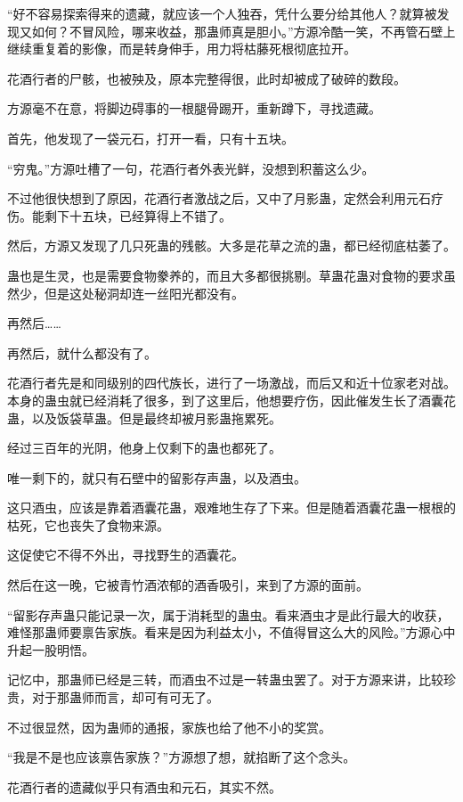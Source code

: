 \begin{this_body}
“好不容易探索得来的遗藏，就应该一个人独吞，凭什么要分给其他人？就算被发现又如何？不冒风险，哪来收益，那蛊师真是胆小。”方源冷酷一笑，不再管石壁上继续重复着的影像，而是转身伸手，用力将枯藤死根彻底拉开。

花酒行者的尸骸，也被殃及，原本完整得很，此时却被成了破碎的数段。

方源毫不在意，将脚边碍事的一根腿骨踢开，重新蹲下，寻找遗藏。

首先，他发现了一袋元石，打开一看，只有十五块。

“穷鬼。”方源吐槽了一句，花酒行者外表光鲜，没想到积蓄这么少。

不过他很快想到了原因，花酒行者激战之后，又中了月影蛊，定然会利用元石疗伤。能剩下十五块，已经算得上不错了。

然后，方源又发现了几只死蛊的残骸。大多是花草之流的蛊，都已经彻底枯萎了。

蛊也是生灵，也是需要食物豢养的，而且大多都很挑剔。草蛊花蛊对食物的要求虽然少，但是这处秘洞却连一丝阳光都没有。

再然后……

再然后，就什么都没有了。

花酒行者先是和同级别的四代族长，进行了一场激战，而后又和近十位家老对战。本身的蛊虫就已经消耗了很多，到了这里后，他想要疗伤，因此催发生长了酒囊花蛊，以及饭袋草蛊。但是最终却被月影蛊拖累死。

经过三百年的光阴，他身上仅剩下的蛊也都死了。

唯一剩下的，就只有石壁中的留影存声蛊，以及酒虫。

这只酒虫，应该是靠着酒囊花蛊，艰难地生存了下来。但是随着酒囊花蛊一根根的枯死，它也丧失了食物来源。

这促使它不得不外出，寻找野生的酒囊花。

然后在这一晚，它被青竹酒浓郁的酒香吸引，来到了方源的面前。

“留影存声蛊只能记录一次，属于消耗型的蛊虫。看来酒虫才是此行最大的收获，难怪那蛊师要禀告家族。看来是因为利益太小，不值得冒这么大的风险。”方源心中升起一股明悟。

记忆中，那蛊师已经是三转，而酒虫不过是一转蛊虫罢了。对于方源来讲，比较珍贵，对于那蛊师而言，却可有可无了。

不过很显然，因为蛊师的通报，家族也给了他不小的奖赏。

“我是不是也应该禀告家族？”方源想了想，就掐断了这个念头。

花酒行者的遗藏似乎只有酒虫和元石，其实不然。


\end{this_body}
